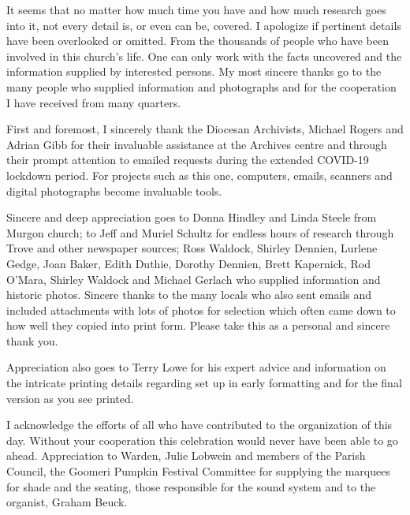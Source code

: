 It seems that no matter how much time you have and how much research goes into it, not every detail is, or even can be, covered. I apologize if pertinent details have been overlooked or omitted. From the thousands of people who have been involved in this church's life. One can only work with the facts uncovered and the information supplied by interested persons. My most sincere thanks go to the many people who supplied information and photographs and for the cooperation I have received from many quarters.



First and foremost, I sincerely thank the Diocesan Archivists, Michael Rogers and Adrian Gibb for their invaluable assistance at the Archives centre and through their prompt attention to emailed requests during the extended COVID-19 lockdown period. For projects such as this one, computers, emails, scanners and digital photographs become invaluable tools.



Sincere and deep appreciation goes to Donna Hindley and Linda Steele from Murgon church; to Jeff and Muriel Schultz for endless hours of research through Trove and other newspaper sources; Ross Waldock, Shirley Dennien, Lurlene Gedge, Joan Baker, Edith Duthie, Dorothy Dennien, Brett Kapernick, Rod O'Mara, Shirley Waldock and Michael Gerlach who supplied information and historic photos. Sincere thanks to the many locals who also sent emails and included attachments with lots of photos for selection which often came down to how well they copied into print form. Please take this as a personal and sincere thank you.



Appreciation also goes to Terry Lowe for his expert advice and information on the intricate printing details regarding set up in early formatting and for the final version as you see printed.



I acknowledge the efforts of all who have contributed to the organization of this day. Without your cooperation this celebration would never have been able to go ahead. Appreciation to Warden, Julie Lobwein and members of the Parish Council, the Goomeri Pumpkin Festival Committee for supplying the marquees for shade and the seating, those responsible for the sound system and to the organist, Graham Beuck.



